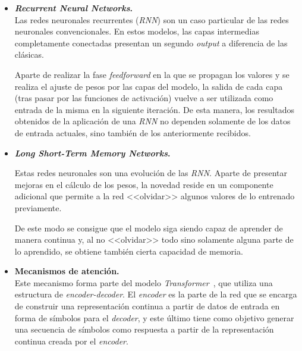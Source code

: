 \begin{itemize}
    \item \textbf{\textit{Recurrent Neural Networks}.}\\
    Las redes neuronales recurrentes (\textit{RNN}) son un caso particular de las redes neuronales convencionales. En estos modelos, las capas intermedias completamente conectadas presentan un segundo \textit{output} a diferencia de las clásicas. 
    
    Aparte de realizar la fase \textit{feedforward} en la que se propagan los valores y se realiza el ajuste de pesos por las capas del modelo, la salida de cada capa (tras pasar por las funciones de activación) vuelve a ser utilizada como entrada de la misma en la siguiente iteración. De esta manera, los resultados obtenidos de la aplicación de una \textit{RNN} no dependen solamente de los datos de entrada actuales, sino también de los anteriormente recibidos. 


    \item \textbf{\textit{Long Short-Term Memory Networks}.}\
  


    Estas redes neuronales son una evolución de las \textit{RNN}. Aparte de presentar mejoras en el cálculo de los pesos, la novedad reside en un componente adicional que permite a la red <<olvidar>> algunos valores de lo entrenado previamente.
    
    De este modo se consigue que el modelo siga siendo capaz de aprender de manera continua y, al no <<olvidar>> todo sino solamente alguna parte de lo aprendido, se obtiene también cierta capacidad de memoria.

    \item \textbf{Mecanismos de atención.}\\    
    Este mecanismo forma parte del modelo \textit{Transformer}~\cite{vaswani2017attention}, que utiliza una estructura de \textit{encoder-decoder}. El \textit{encoder} es la parte de la red que se encarga de construir una representación continua a partir de datos de entrada en forma de símbolos para el \textit{decoder}, y este último tiene como objetivo generar una secuencia de símbolos como respuesta a partir de la representación continua creada por el \textit{encoder}.


\end{itemize}
